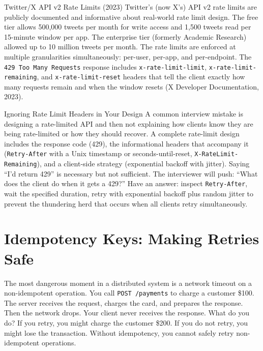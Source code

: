 \documentclass[11pt,a4paper]{article}
\begin{document}
\begin{industrybox}{Twitter/X API v2 Rate Limits (2023)}
Twitter's (now X's) API v2 rate limits are publicly documented and informative about real-world rate limit design. The free tier allows 500,000 tweets per month for write access and 1,500 tweets read per 15-minute window per app. The enterprise tier (formerly Academic Research) allowed up to 10 million tweets per month. The rate limits are enforced at multiple granularities simultaneously: per-user, per-app, and per-endpoint. The \texttt{429 Too Many Requests} response includes \texttt{x-rate-limit-limit}, \texttt{x-rate-limit-remaining}, and \texttt{x-rate-limit-reset} headers that tell the client exactly how many requests remain and when the window resets (X Developer Documentation, 2023).
\end{industrybox}

\begin{trapbox}{Ignoring Rate Limit Headers in Your Design}
A common interview mistake is designing a rate-limited API and then not explaining how clients know they are being rate-limited or how they should recover. A complete rate-limit design includes the response code (429), the informational headers that accompany it (\texttt{Retry-After} with a Unix timestamp or seconds-until-reset, \texttt{X-RateLimit-Remaining}), and a client-side strategy (exponential backoff with jitter). Saying ``I'd return 429'' is necessary but not sufficient. The interviewer will push: ``What does the client do when it gets a 429?'' Have an answer: inspect \texttt{Retry-After}, wait the specified duration, retry with exponential backoff plus random jitter to prevent the thundering herd that occurs when all clients retry simultaneously.
\end{trapbox}

\section{Idempotency Keys: Making Retries Safe}
\label{sec:idempotency}

The most dangerous moment in a distributed system is a network timeout on a non-idempotent operation. You call \texttt{POST /payments} to charge a customer \$100. The server receives the request, charges the card, and prepares the response. Then the network drops. Your client never receives the response. What do you do? If you retry, you might charge the customer \$200. If you do not retry, you might lose the transaction. Without idempotency, you cannot safely retry non-idempotent operations.
\end{document}
